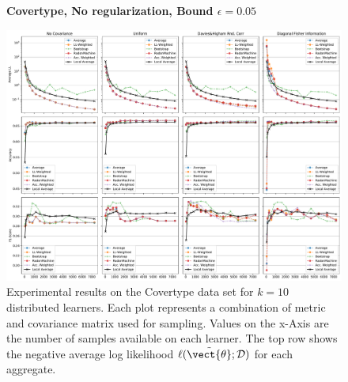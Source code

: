     \begin{landscape}
    \begin{figure}
        \centering
        \textbf{Covertype, No regularization, Bound $\epsilon=0.05$}\par\medskip
        \includegraphics[height=\dimexpr \textheight - 4\baselineskip\relax]{kapitel/figures/covertype_None_0.05.pdf}
        \caption[Covertype without regularization and $\epsilon=0.05$]{Experimental results on the Covertype data set for $k=10$ distributed learners. Each plot represents a combination of metric and covariance matrix used for sampling. Values on the x-Axis are the number of samples available on each learner. The top row shows the negative average log likelihood $\ell(\tilde{\vect{\theta}}; \mathcal{D})$ for each aggregate.}
        \label{fig:analysis8}
    \end{figure}
    \end{landscape}
